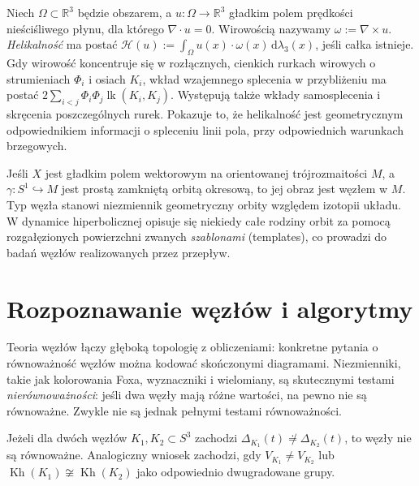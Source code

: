 \begin{przyklad}
Niech $\Omega\subset\mathbb R^3$ będzie obszarem,
a $u\colon\Omega\to\mathbb R^3$ gładkim polem prędkości
nieściśliwego płynu, dla którego
$\nabla\cdot u=0$. Wirowością nazywamy
$\omega:=\nabla\times u$.
\emph{Helikalność} ma postać
$\mathcal H(u):=\int_\Omega u(x)\cdot\omega(x)\,
\mathrm d\lambda_3(x)$, jeśli całka istnieje.
Gdy wirowość koncentruje się w rozłącznych, cienkich
rurkach wirowych o strumieniach $\Phi_i$ i osiach
$K_i$, wkład wzajemnego splecenia w przybliżeniu
ma postać $2\sum_{i<j}\Phi_i\Phi_j\operatorname{lk}(K_i,K_j)$.
Występują także wkłady samosplecenia i skręcenia
poszczególnych rurek. Pokazuje to, że helikalność jest
geometrycznym odpowiednikiem informacji o spleceniu
linii pola, przy odpowiednich warunkach brzegowych.
\end{przyklad}

\begin{uwaga}
Jeśli $X$ jest gładkim polem wektorowym na orientowanej
trójrozmaitości $M$, a $\gamma\colon S^1\hookrightarrow M$
jest prostą zamkniętą orbitą okresową, to jej obraz
jest węzłem w $M$. Typ węzła stanowi niezmiennik
geometryczny orbity względem izotopii układu.
W dynamice hiperbolicznej opisuje się niekiedy całe rodziny
orbit za pomocą rozgałęzionych powierzchni zwanych
\emph{szablonami} (templates), co prowadzi do badań
węzłów realizowanych przez przepływ.
\end{uwaga}

\section{Rozpoznawanie węzłów i algorytmy}
\label{sec:kt-algorytmy}

Teoria węzłów łączy głęboką topologię z obliczeniami:
konkretne pytania o równoważność węzłów można kodować
skończonymi diagramami. Niezmienniki, takie jak kolorowania
Foxa, wyznaczniki i wielomiany, są skutecznymi testami
\emph{nierównoważności}: jeśli dwa węzły mają różne wartości,
na pewno nie są równoważne. Zwykle nie są jednak pełnymi
testami równoważności.

\begin{stwierdzenie}
Jeżeli dla dwóch węzłów $K_1,K_2\subset S^3$ zachodzi
$\Delta_{K_1}(t)\not\doteq\Delta_{K_2}(t)$, to węzły
nie są równoważne. Analogiczny wniosek zachodzi,
gdy $V_{K_1}\ne V_{K_2}$ lub
$\operatorname{Kh}(K_1)\not\cong\operatorname{Kh}(K_2)$
jako odpowiednio dwugradowane grupy.
\end{stwierdzenie}

